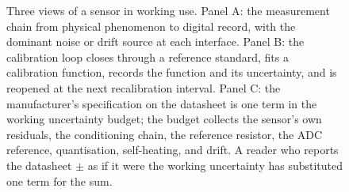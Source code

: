 \begin{figure}[p]
\caption[The sensor measurement chain, the calibration loop, and the
working uncertainty budget]{Three views of a sensor in working use.
Panel A: the measurement chain from physical phenomenon to digital
record, with the dominant noise or drift source at each interface.
Panel B: the calibration loop closes through a reference standard,
fits a calibration function, records the function and its
uncertainty, and is reopened at the next recalibration interval.
Panel C: the manufacturer's specification on the datasheet is one
term in the working uncertainty budget; the budget collects the
sensor's own residuals, the conditioning chain, the reference
resistor, the ADC reference, quantisation, self-heating, and
drift. A reader who reports the datasheet $\pm$ as if it were the
working uncertainty has substituted one term for the sum.}
\label{fig:vol01:ch05:sensor-chain}
\end{figure}
